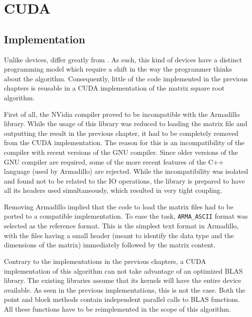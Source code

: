 \documentclass[../thesis]{subfiles}
\begin{document}
	\chapter{CUDA}

	\section{Implementation}
	Unlike \mic devices, \gpus differ greatly from \cpus. As such, this kind of devices have a distinct programming model which require a shift in the way the programmer thinks about the algorithm. Consequently, little of the code implemented in the previous chapters is reusable in a CUDA implementation of the matrix square root algorithm.

	First of all, the NVidia compiler proved to be incompatible with the Armadillo library. While the usage of this library was reduced to loading the matrix file and outputting the result in the previous chapter, it had to be completely removed from the CUDA implementation. The reason for this is an incompatibility of the \nvidia compiler with recent versions of the GNU compiler. Since older versions of the GNU compiler are required, some of the more recent features of the C++ language (used by Armadillo) are rejected. While the incompatibility was isolated and found not to be related to the IO operations, the library is prepared to have all its headers used simultaneously, which resulted in very tight coupling.

	Removing Armadillo implied that the code to load the matrix files had to be ported to a compatible implementation. To ease the task, \texttt{ARMA\_ASCII} format was selected as the reference format. This is the simplest text format in Armadillo, with the files having a small header (meant to identify the data type and the dimensions of the matrix) immediately followed by the matrix content.

	Contrary to the implementations in the previous chapters, a CUDA implementation of this algorithm can not take advantage of an optimized BLAS library. The existing libraries assume that its kernels will have the entire device available. As seen in the previous implementations, this is not the case. Both the point and block methods contain independent parallel calls to BLAS functions. All these functions have to be reimplemented in the scope of this algorithm.
\end{document}
